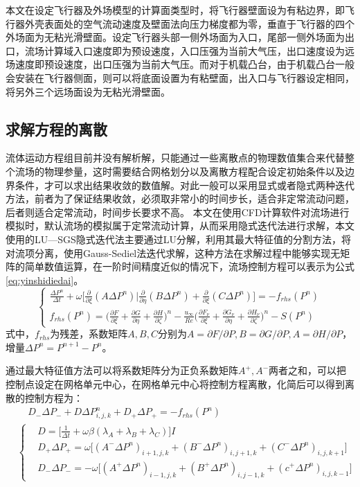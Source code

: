 本文在设定飞行器及外场模型的计算面类型时，将飞行器壁面设为有粘边界，即飞行器外壳表面处的空气流动速度及壁面法向压力梯度都为零，垂直于飞行器的四个外场面为无粘光滑壁面。设定飞行器头部一侧外场面为入口，尾部一侧外场面为出口，流场计算域入口速度即为预设速度，入口压强为当前大气压，出口速度设为远场速度即预设速度，出口压强为当前大气压。而对于机载凸台，由于机载凸台一般会安装在飞行器侧面，则可以将底面设置为有粘壁面，出入口与飞行器设定相同，将另外三个远场面设为无粘光滑壁面。
\subsection{求解方程的离散}
流体运动方程组目前并没有解析解，只能通过一些离散点的物理数值集合来代替整个流场的物理参量，这时需要结合网格划分以及离散方程配合设定初始条件以及边界条件，才可以求出结果收敛的数值解。对此一般可以采用显式或者隐式两种迭代方法，前者为了保证结果收敛，必须取非常小的时间步长，适合非定常流动问题，后者则适合定常流动，时间步长要求不高。
本文在使用CFD计算软件对流场进行模拟时，默认流场的模拟属于定常流动计算，从而采用隐式迭代法进行求解，本文使用的LU—SGS隐式迭代法主要通过LU分解，利用其最大特征值的分割方法，将对流项分离，使用Gauss-Sediel法迭代求解，这种方法在求解过程中能够实现无矩阵的简单数值运算，在一阶时间精度近似的情况下，流场控制方程可以表示为公式\eqref{eq:yinshidiedai}。
\begin{equation}
\left\{
\begin{aligned}
\frac{\Delta P^n}{\Delta t}+\omega\Big[\frac{\partial}{\partial\xi}(A\Delta P^n)|\frac{\partial}{\partial\eta}(B\Delta P^n)+\frac{\partial}{\partial\xi}(C\Delta P^n)\Big]=-f_{rhs}(P^n)\\
f_{rhs}(P^n)=\Big(\frac{\partial F}{\partial\xi}+\frac{\partial G}{\partial\eta}+\frac{\partial H}{\partial\zeta}\Big)^n-\frac{u_\infty}{Re}\Big(\frac{\partial F_\nu}{\partial\xi}+\frac{\partial G_\nu}{\partial\eta}+\frac{\partial H_\nu}{\partial\zeta}\Big)^n-S(P^n)
\end{aligned}
\right.
\label{eq:yinshidiedai}
\end{equation}
式中，$f_{rhs}$为残差，系数矩阵$A,B,C$分别为$A=\partial F/\partial P,B=\partial G/\partial P,A=\partial H/\partial P$，增量$\Delta P^n=P^{n+1}-P^n$。

通过最大特征值方法可以将系数矩阵分为正负系数矩阵$A^+,A^-$两者之和，可以把控制点设定在网格单元中心，在网格单元中心将控制方程离散，化简后可以得到离散的控制方程为：
\begin{align}
&~~~~~D_-\Delta P_-+D\Delta P_{i,j,k}^n+D_+\Delta P_+=-f_{rhs}(P^n)
\label{eq:lufenjie}
\\&\left\{
\begin{aligned}
&D=\Big[\frac{1}{\Delta t}+\omega\beta(\lambda_A+\lambda_B+\lambda_C)\Big]I\\
&D_+\Delta P_+=\omega\big[(A^-\Delta P^n)_{i+1,j,k}+(B^-\Delta P^n)_{i,j+1,k}+(C^-\Delta P^n)_{i,j,k+1}\big]\\
&D_-\Delta P_-=-\omega\big[(A^+\Delta P^n)_{i-1,j,k}+(B^+\Delta P^n)_{i,j-1,k}+(c^+\Delta P^n)_{i,j,k-1}\big]
\end{aligned}\right.
\end{align}

